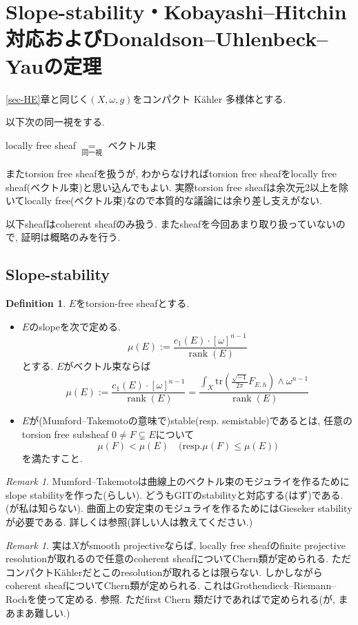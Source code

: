 \documentclass[dvipdfmx,a4paper,11pt]{article} %
\theoremstyle{definition}
\newtheorem{defn}[thm]{Definition}
\theoremstyle{remark}
\newtheorem{rem}[thm]{Remark}
\numberwithin{equation}{section}
\begin{document}
\newpage
\section{Slope-stability・Kobayashi--Hitchin対応およびDonaldson--Uhlenbeck--Yauの定理}
\label{sec-slope}
\ref{sec-HE}章と同じく$(X, \omega, g)$をコンパクト Kähler 多様体とする. 

\begin{tcolorbox}[mybox]
以下次の同一視をする.
\begin{center}
locally free sheaf 
$\underset{\text{同一視}}{=}$ ベクトル束
\end{center}
\end{tcolorbox}
またtorsion free sheafを扱うが, わからなければtorsion free sheafをlocally free sheaf(ベクトル束)と思い込んでもよい. 実際torsion free sheafは余次元2以上を除いてlocally free(ベクトル束)なので本質的な議論には余り差し支えがない. 

以下sheafはcoherent sheafのみ扱う. 
またsheafを今回あまり取り扱っていないので, 証明は概略のみを行う. 



\subsection{Slope-stability}

\begin{defn}
$E$をtorsion-free sheafとする. 
\begin{itemize}
\item $E$のslopeを次で定める. 
$$
\mu(E):=
\frac{c_1(E) \cdot[\omega]^{n-1}}{\operatorname{rank} (E)}
$$
とする. $E$がベクトル束ならば
$$
\mu(E):=
\frac{c_1(E) \cdot [\omega]^{n-1}}{\operatorname{rank} (E)}
=
\frac{\int_{X}\mathrm{tr} \left(\frac{\sqrt{-1}}{2\pi}F_{E,h}\right) \wedge \omega^{n-1}}{\operatorname{rank} (E)}
$$
\item $E$が(Mumford--Takemotoの意味で)stable(resp. semistable)であるとは, 任意のtorsion free subsheaf $0 \neq F \subsetneq E$について
$$
\mu(F) < \mu(E)
\quad\text{(resp.
$\mu(F) \le \mu(E)$
)}
$$
を満たすこと.
\end{itemize}
\end{defn}

\begin{rem}
Mumford--Takemotoは曲線上のベクトル束のモジュライを作るためにslope stabilityを作った(らしい). 
どうもGITのstabilityと対応する(はず)である.(が私は知らない).
曲面上の安定束のモジュライを作るためにはGieseker stabilityが必要である. 詳しくは\cite{HL10}参照(詳しい人は教えてください.)
\end{rem}
\begin{rem}
実は$X$がsmooth projectiveならば, locally free sheafのfinite projective resolutionが取れるので任意のcoherent sheafについてChern類が定められる. 
ただコンパクトKählerだとこのresolutionが取れるとは限らない. 
しかしながらcoherent sheafについてChern類が定められる. これはGrothendieck--Riemann--Rochを使って定める. \cite{Gri10}参照. 
ただfirst Chern 類だけであれば\cite[Chapter 5]{Kob14}で定められる(が, まあまあ難しい.)
\end{rem}
\end{document}
